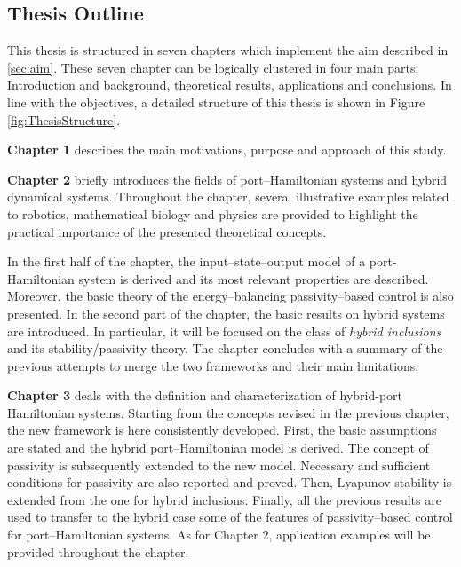 \subsection{Thesis Outline}
This thesis is structured in seven chapters which implement the aim described in \ref{sec:aim}. 
These seven chapter can be logically clustered in four main parts: Introduction and background, theoretical results, applications and conclusions. In line with the objectives, a detailed structure of this thesis is shown in Figure \ref{fig:ThesisStructure}.
%
\newline

%
\textbf{Chapter 1} describes the main motivations, purpose and approach of this study.
%
\newline

%
\textbf{Chapter 2} briefly introduces the fields of port--Hamiltonian systems and hybrid dynamical systems. Throughout the chapter, several illustrative examples related to robotics, mathematical biology and physics are provided to highlight the practical importance of the presented theoretical concepts. 

In the first half of the chapter, the input--state--output model of a port-Hamiltonian system is derived and its most relevant properties are described. Moreover, the basic theory of the energy--balancing passivity--based control is also presented. In the second part of the chapter, the basic results on hybrid systems are introduced. In particular, it will be focused on the class of \textit{hybrid inclusions} and its stability/passivity theory.  The chapter concludes with a summary of the previous attempts to merge the two frameworks and their main limitations. 
%
\newline

%
\textbf{Chapter 3} deals with the definition and characterization of hybrid-port Hamiltonian systems. Starting from the concepts revised in the previous chapter, the new framework is here consistently developed. First, the basic assumptions are stated and the hybrid port--Hamiltonian model is derived. The concept of passivity is subsequently extended to the new model. Necessary and sufficient conditions for passivity are also reported and proved. Then, Lyapunov stability is extended from the one for hybrid inclusions. Finally, all the previous results are used to transfer to the hybrid case some of the features of passivity--based control for port--Hamiltonian systems. As for Chapter 2, application examples will be provided throughout the chapter.
%
\newline

